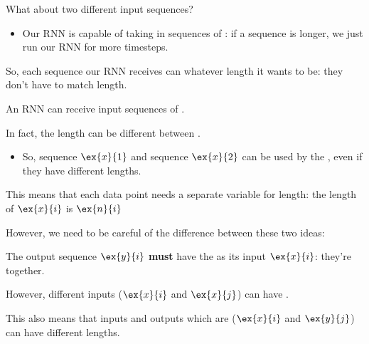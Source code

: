         What about two different input sequences? 

        \begin{itemize}
            \item Our RNN is capable of taking in sequences of : if a sequence is longer, we just run our RNN for more timesteps.
        \end{itemize}

        So, each sequence our RNN receives can whatever length it wants to be: they don't have to match length.\\

        \begin{concept}
            An RNN can receive input sequences of .

            In fact, the length can be different between .

            \begin{itemize}
                \item So, sequence $\ex{x}{1}$ and sequence $\ex{x}{2}$ can be used by the , even if they have different lengths.
            \end{itemize}

            \subsecdiv

            This means that each data point needs a separate variable for length: the length of $\ex{x}{i}$ is $\ex{n}{i}$
            
        \end{concept}

        However, we need to be careful of the difference between these two ideas:\\

        \begin{clarification}
            The output sequence $\ex{y}{i}$ \textbf{must} have the  as its input $\ex{x}{i}$: they're  together.

            However, different inputs ($\ex{x}{i}$ and $\ex{x}{j}$) can have .

            \subsecdiv
            
            This also means that inputs and outputs which are  ($\ex{x}{i}$ and $\ex{y}{j}$) can have different lengths.
        \end{clarification}


